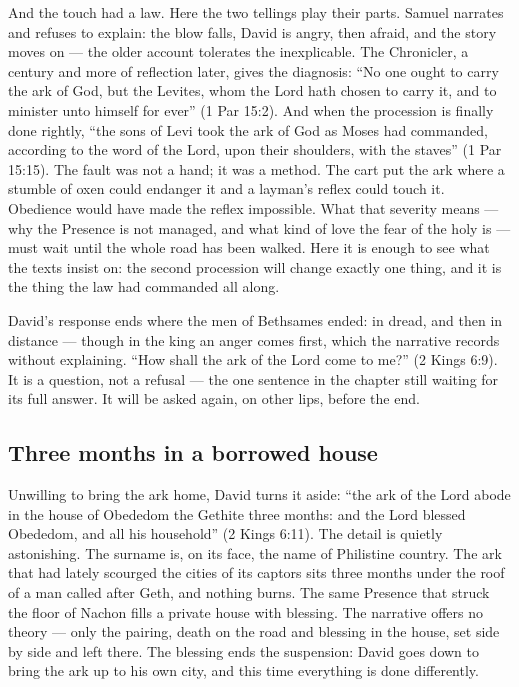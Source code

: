 And the touch had a law. Here the two tellings play their parts. Samuel
narrates and refuses to explain: the blow falls, David is angry, then
afraid, and the story moves on --- the older account tolerates the
inexplicable. The Chronicler, a century and more of reflection later, gives
the diagnosis: ``No one ought to carry the ark of God, but the Levites, whom
the Lord hath chosen to carry it, and to minister unto himself for ever''
(1 Par 15:2). And when the procession is finally done rightly, ``the sons
of Levi took the ark of God as Moses had commanded, according to the word
of the Lord, upon their shoulders, with the staves'' (1 Par 15:15). The fault
was not a hand; it was a method. The cart put the ark where a stumble of
oxen could endanger it and a layman's reflex could touch it. Obedience
would have made the reflex impossible. What that severity means --- why the
Presence is not managed, and what kind of love the fear of the holy is ---
must wait until the whole road has been walked. Here it is enough to see
what the texts insist on: the second procession will change exactly one thing, and it is the
thing the law had commanded all along.

David's response ends where the men of Bethsames ended: in dread, and then
in distance --- though in the king an anger comes first, which the
narrative records without explaining. ``How shall the ark of the Lord come
to me?'' (2 Kings 6:9). It is a question, not a refusal --- the one sentence
in the chapter still waiting for its full answer. It will be asked again,
on other lips, before the end.

\subsection{Three months in a borrowed house}

Unwilling to bring the ark home, David turns it aside: ``the ark of the Lord
abode in the house of Obededom the Gethite three months: and the Lord
blessed Obededom, and all his household'' (2 Kings 6:11). The detail is
quietly astonishing. The surname is, on its face, the name of Philistine
country. The ark that had lately scourged the cities of its captors sits
three months under the roof of a man called after Geth, and nothing burns.
The same Presence that struck the floor of Nachon fills a private house
with blessing. The narrative offers no theory --- only the pairing, death
on the road and blessing in the house, set side by side and left there. The
blessing ends the suspension: David goes down to bring the ark up to his
own city, and this time everything is done differently.

